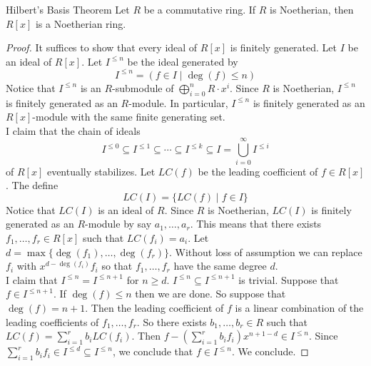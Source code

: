 \documentclass[a4paper]{article}
\begin{document}
\begin{thm}{Hilbert's Basis Theorem}{} Let $R$ be a commutative ring. If $R$ is Noetherian, then $R[x]$ is a Noetherian ring. 
\begin{proof}
It suffices to show that every ideal of $R[x]$ is finitely generated. Let $I$ be an ideal of $R[x]$. Let $I^{\leq n}$ be the ideal generated by $$I^{\leq n}=(f\in I\;|\;\deg(f)\leq n)$$ Notice that $I^{\leq n}$ is an $R$-submodule of $\bigoplus_{i=0}^nR\cdot x^i$. Since $R$ is Noetherian, $I^{\leq n}$ is finitely generated as an $R$-module. In particular, $I^{\leq n}$ is finitely generated as an $R[x]$-module with the same finite generating set. \\

I claim that the chain of ideals $$I^{\leq 0}\subseteq I^{\leq 1}\subseteq\cdots\subseteq I^{\leq k}\subseteq I=\bigcup_{i=0}^\infty I^{\leq i}$$ of $R[x]$ eventually stabilizes. Let $LC(f)$ be the leading coefficient of $f\in R[x]$. The define $$LC(I)=\{LC(f)\;|\;f\in I\}$$ Notice that $LC(I)$ is an ideal of $R$. Since $R$ is Noetherian, $LC(I)$ is finitely generated as an $R$-module by say $a_1,\dots,a_r$. This means that there exists $f_1,\dots,f_r\in R[x]$ such that $LC(f_i)=a_i$. Let $d=\max\{\deg(f_1),\dots,\deg(f_r)\}$. Without loss of assumption we can replace $f_i$ with $x^{d-\deg(f_i)}f_i$ so that $f_1,\dots,f_r$ have the same degree $d$. \\

I claim that $I^{\leq n}=I^{\leq n+1}$ for $n\geq d$. $I^{\leq n}\subseteq I^{\leq n+1}$ is trivial. Suppose that $f\in I^{\leq n+1}$. If $\deg(f)\leq n$ then we are done. So suppose that $\deg(f)=n+1$. Then the leading coefficient of $f$ is a linear combination of the leading coefficients of $f_1,\dots,f_r$. So there exists $b_1,\dots,b_r\in R$ such that $LC(f)=\sum_{i=1}^rb_iLC(f_i)$. Then $f-\left(\sum_{i=1}^rb_if_i\right)x^{n+1-d}\in I^{\leq n}$. Since $\sum_{i=1}^rb_if_i\in I^{\leq d}\subseteq I^{\leq n}$, we conclude that $f\in I^{\leq n}$. We conclude. 
\end{proof}
\end{thm}
\end{document}
